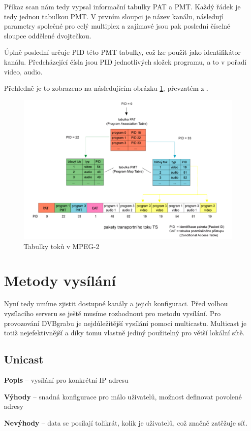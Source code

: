 Příkaz scan nám tedy vypsal informační tabulky PAT a PMT. Každý řádek je tedy jednou tabulkou PMT. V prvním sloupci je název kanálu, následují parametry společné pro celý multiplex a zajímavé jsou pak poslední číselné sloupce oddělené dvojtečkou.

Úplně poslední určuje PID této PMT tabulky, což lze použít jako identifikátor kanálu.
Předcházející čísla jsou PID jednotlivých složek programu, a to v pořadí video, audio.

Přehledně je to zobrazeno na následujícím obrázku \ref{fig:PATaPMT}, převzatém z \cite{digitvURL}.
\vfill
\pagebreak

\begin{figure}[ht]
\begin{center}
\includegraphics[width=15cm]{images/PATaPMT}
\caption{Tabulky toků v MPEG-2}
\label{fig:PATaPMT}
\end{center}
\end{figure}

\section{Metody vysílání}
Nyní tedy umíme zjistit dostupné kanály a jejich konfiguraci. Před volbou vysílacího serveru se ještě musíme rozhodnout pro metodu vysílání.
Pro provozování DVBgrabu je nejdůležitější vysílání pomocí multicastu. Multicast je totiž nejefektivnější a díky tomu vlastně jediný použitelný pro větší lokální sítě. 

\subsection{Unicast}
\bitem
\item \textbf{Popis} -- vysílání pro konkrétní IP adresu
\item \textbf{Výhody} -- snadná konfigurace pro málo uživatelů, možnost definovat povolené adresy
\item \textbf{Nevýhody} -- data se posílají tolikrát, kolik je uživatelů, což značně zatěžuje síť.
\eitem

